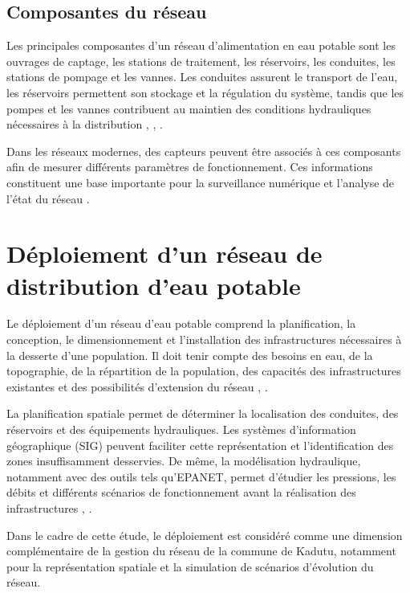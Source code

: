 \subsection{Composantes du réseau}
\label{composantes-du-reseau}

Les principales composantes d'un réseau d'alimentation en eau potable
sont les ouvrages de captage, les stations de traitement, les réservoirs,
les conduites, les stations de pompage et les vannes. Les conduites
assurent le transport de l'eau, les réservoirs permettent son stockage et
la régulation du système, tandis que les pompes et les vannes contribuent
au maintien des conditions hydrauliques nécessaires à la distribution
\cite{ref33}, \cite{ref34}, \cite{ref35}.

Dans les réseaux modernes, des capteurs peuvent être associés à ces
composants afin de mesurer différents paramètres de fonctionnement.
Ces informations constituent une base importante pour la surveillance
numérique et l'analyse de l'état du réseau \cite{ref20}.

\section{Déploiement d'un réseau de distribution d'eau potable}
\label{deploiement-dun-reseau-de-distribution-deau-potable}

Le déploiement d'un réseau d'eau potable comprend la planification, la
conception, le dimensionnement et l'installation des infrastructures
nécessaires à la desserte d'une population. Il doit tenir compte des
besoins en eau, de la topographie, de la répartition de la population,
des capacités des infrastructures existantes et des possibilités
d'extension du réseau \cite{ref38}, \cite{ref39}.

La planification spatiale permet de déterminer la localisation des
conduites, des réservoirs et des équipements hydrauliques. Les systèmes
d'information géographique (SIG) peuvent faciliter cette représentation
et l'identification des zones insuffisamment desservies. De même, la
modélisation hydraulique, notamment avec des outils tels qu'EPANET,
permet d'étudier les pressions, les débits et différents scénarios de
fonctionnement avant la réalisation des infrastructures
\cite{ref40}, \cite{ref34}.

Dans le cadre de cette étude, le déploiement est considéré comme une
dimension complémentaire de la gestion du réseau de la commune de
Kadutu, notamment pour la représentation spatiale et la simulation de
scénarios d'évolution du réseau.

